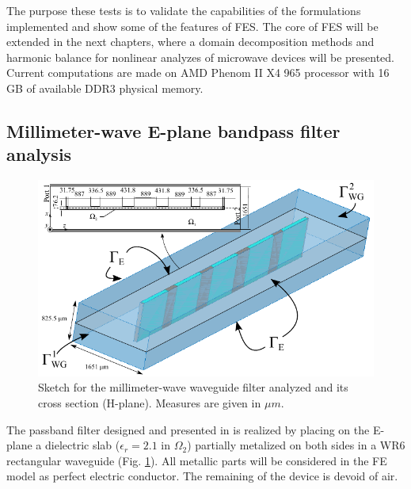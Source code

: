 The purpose these tests is to validate the capabilities of the formulations implemented and show some of the features of FES. The core of FES will be extended in the next chapters, where a domain decomposition methods and harmonic balance for nonlinear analyzes of microwave devices will be presented. Current computations are made on AMD Phenom II X4 965 processor with 16 GB of available DDR3 physical memory.

\subsection{Millimeter-wave E-plane bandpass filter analysis}

\begin{figure}[ht!]
\centering
\includegraphics[width=14.4cm]{Bui1984}
\caption{Sketch for the millimeter-wave waveguide filter analyzed and its cross section (H-plane). Measures are given in $\mu m$. }
\label{fig:Bui1984}
\end{figure}

The passband filter designed and presented in \cite{bui1984broad} is realized
by placing on the E-plane a dielectric slab ($\epsilon_r = 2.1$ in $\Omega_2$) partially metalized on both sides in a WR6 rectangular waveguide (Fig. \ref{fig:Bui1984}). All metallic parts will be considered in the FE model as perfect electric conductor. The remaining of the device is devoid of air.

